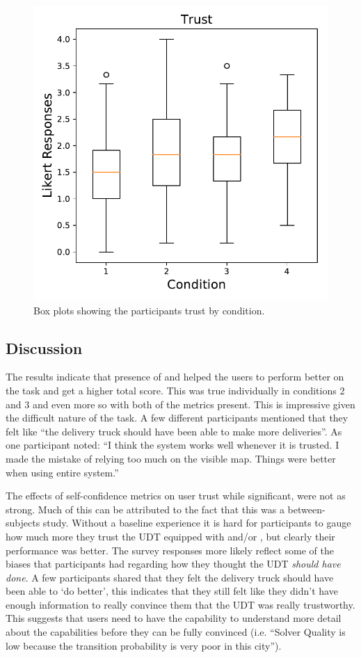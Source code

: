        \begin{figure}[tb]
            \centering
            \includegraphics[width=0.8\linewidth]{Figures/trust_box.pdf}
            \caption{Box plots showing the participants trust by condition.}
            \label{fig:trust_box}
       \end{figure}

\subsection{Discussion}
The results indicate that presence of \xQ{} and \xO{} helped the users to perform better on the task and get a higher total score. This was true individually in conditions 2 and 3 and even more so with both of the metrics present. This is impressive given the difficult nature of the task. A few different participants mentioned that they felt like ``the delivery truck should have been able to make more deliveries''. As one participant noted: ``I think the system works well whenever it is trusted. I made the mistake of relying too much on the visible map. Things were better when using entire system.''

The effects of self-confidence metrics on user trust while significant, were not as strong. Much of this can be attributed to the fact that this was a between-subjects study. Without a baseline experience it is hard for participants to gauge how much more they trust the UDT equipped with \xQ{} and/or \xO, but clearly their performance was better. The survey responses more likely reflect some of the biases that participants had regarding how they thought the UDT \emph{should have done}. A few participants shared that they felt the delivery truck should have been able to `do better', this indicates that they still felt like they didn't have enough information to really convince them that the UDT was really trustworthy. This suggests that users need to have the capability to understand more detail about the capabilities before they can be fully convinced (i.e. ``Solver Quality is low because the transition probability is very poor in this city'').

